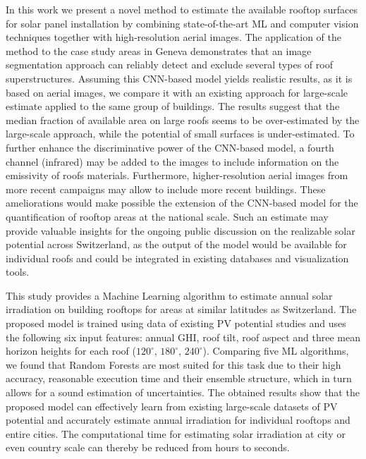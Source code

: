 In this work we present a novel method to estimate the available rooftop surfaces for solar panel installation by combining state-of-the-art ML and computer vision techniques together with high-resolution aerial images. The application of the method to the case study areas in Geneva demonstrates that an image segmentation approach can reliably detect and exclude several types of roof superstructures. Assuming this CNN-based model yields realistic results, as it is based on aerial images, we compare it with an existing approach for large-scale estimate applied to the same group of buildings. The results suggest that the median fraction of available area on large roofs seems to be over-estimated by the large-scale approach, while the potential of small surfaces is under-estimated. To further enhance the discriminative power of the CNN-based model, a fourth channel (infrared) may be added to the images to include information on the emissivity of roofs materials. Furthermore, higher-resolution aerial images from more recent campaigns may allow to include more recent buildings. These ameliorations would make possible the extension of the CNN-based model for the quantification of rooftop areas at the national scale. Such an estimate may provide valuable insights for the ongoing public discussion on the realizable solar potential across Switzerland, as the output of the model would be available for individual roofs and could be integrated in existing databases and visualization tools.

This study provides a Machine Learning algorithm to estimate annual solar irradiation on building rooftops for areas at similar latitudes as Switzerland. The proposed model is trained using data of existing PV potential studies and uses the following six input features: annual GHI, roof tilt, roof aspect and three mean horizon heights for each roof ($120^\circ$, $180^\circ$, $240^\circ$). Comparing five ML algorithms, we found that Random Forests are most suited for this task due to their high accuracy, reasonable execution time and their ensemble structure, which in turn allows for a sound estimation of uncertainties. The obtained results show that the proposed model can effectively learn from existing large-scale datasets of PV potential and accurately estimate annual irradiation for individual rooftops and entire cities. The computational time for estimating solar irradiation at city or even country scale can thereby be reduced from hours to seconds.

